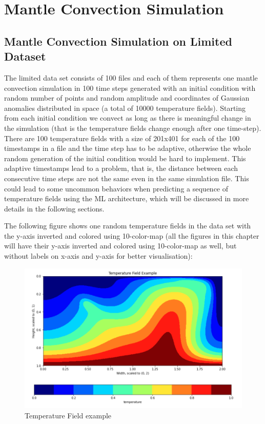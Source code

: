 \chapter{Mantle Convection Simulation}\label{chap:evaluation}

\section{Mantle Convection Simulation on Limited Dataset}

The limited data set consists of 100 files and each of them represents one mantle convection simulation in 100 time steps generated with an initial condition with random number of points and random amplitude and coordinates of Gaussian anomalies distributed in space (a total of 10000 temperature fields). Starting from each initial condition we convect as long as there is meaningful change in the simulation (that is the temperature fields change enough after one time-step). There are 100 temperature fields with a size of 201x401 for each of the 100 timestamps in a file and the time step has to be adaptive, otherwise the whole random generation of the initial condition would be hard to implement. This adaptive timestamps lead to a problem, that is, the distance between each consecutive time steps are not the same even in the same simulation file. This could lead to some uncommon behaviors when predicting a sequence of temperature fields using the ML architecture, which will be discussed in more details in the following sections.

The following figure shows one random temperature fields in the data set with the y-axis inverted and colored using 10-color-map (all the figures in this chapter will have their y-axis inverted and colored using 10-color-map as well, but without labels on x-axis and y-axis for better visualisation):

\begin{figure}[H]
    \caption{Temperature Field example}
    \includegraphics[scale=0.6]{figures/mantle_convection_images/temperature_field_example.png}
\end{figure}


